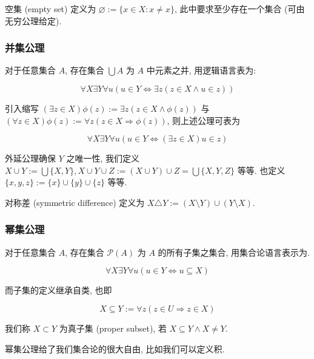 \begin{definition}
    空集 (empty set) 定义为 \(\varnothing := \{x \in X : x \neq x\}\), 此中要求至少存在一个集合 (可由无穷公理给定).
\end{definition}

\subsubsection{并集公理}

对于任意集合 \(A\), 存在集合 \(\bigcup A\) 为 \(A\) 中元素之并, 用逻辑语言表为:

\[
    \forall X \exists Y \forall u (u \in Y \Leftrightarrow \exists z (z \in X \wedge u \in z))
\]

引入缩写 \((\exists z \in X) \phi(z) := \exists z (z \in X \wedge \phi(z))\) 与
\((\forall z \in X) \phi(z) := \forall z (z \in X \Rightarrow \phi(z))\), 则上述公理可表为

\[
    \forall X \exists Y \forall u (u \in Y \Leftrightarrow (\exists z \in X) u \in z)
\]

外延公理确保 \(Y\) 之唯一性, 我们定义 \(X \cup Y := \bigcup \{X, Y\}, X \cup Y \cup Z := (X \cup Y) \cup Z = \bigcup \{X,Y,Z\}\)
等等. 也定义 \(\{x, y, z\} := \{x\} \cup \{y\} \cup \{z\}\) 等等.

\begin{definition}
    对称差 (symmetric difference) 定义为 \(X \triangle Y := (X \setminus Y) \cup (Y \setminus X)\).
\end{definition}

\subsubsection{幂集公理}

对于任意集合 \(A\), 存在集合 \(\mathcal{P}(A)\) 为 \(A\) 的所有子集之集合, 用集合论语言表示为.

\[
    \forall X \exists Y \forall u (u \in Y \Leftrightarrow u \subseteq X)
\]

而子集的定义继承自类, 也即

\[
    X \subseteq Y := \forall z (z \in U \Rightarrow z \in X)
\]

\begin{definition}
    我们称 \(X \subset Y\) 为真子集 (proper subset), 若 \(X \subseteq Y \wedge X \neq Y\).
\end{definition}

幂集公理给了我们集合论的很大自由, 比如我们可以定义积.

